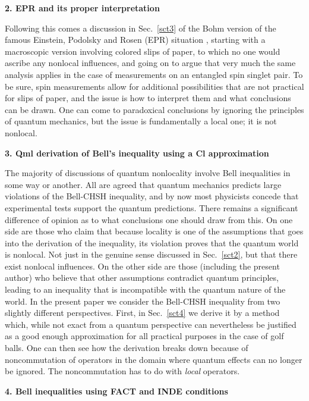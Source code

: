 \documentclass[10pt]{article} %
\def\outl#1{\par{\medskip\noindent\hspace*{.5cm}\bf
      \mathversion{bold}#1\mathversion{normal}\smallskip} }
\def\np{} \def\xa{} \def\xb{} \def\xn{} \def\xp{}
\def\outl#1{} \def\np{} \def\xa{} \def\xb{} \def\xn{} \def\xp{}
\def\outl#1{\par{\medskip\noindent\hspace*{.5cm}\bf
      \mathversion{bold}#1\mathversion{normal}\smallskip} }
\def\np{\newpage }\def\xn{\nopagebreak }\def\xp{\pagebreak }
\begin{document}
\xb
\outl{2. EPR and its proper interpretation }
\xa



Following this comes a discussion in Sec.~\ref{sct3} of the Bohm version
\cite{Bhm51s} of the famous Einstein, Podolsky and Rosen (EPR) situation
\cite{EnPR35}, starting with a macroscopic version involving colored slips of
paper, to which no one would ascribe any nonlocal influences, and going on to
argue that very much the same analysis applies in the case of measurements on
an entangled spin singlet pair.  To be sure, spin measurements allow for
additional possibilities that are not practical for slips of paper, and the
issue is how to interpret them and what conclusions can be drawn.  One can
come to paradoxical conclusions by ignoring the principles of quantum
mechanics, but the issue is fundamentally a local one; it is not nonlocal.

\xb
\outl{3. Qml derivation of Bell's inequality using a Cl approximation}
\xa


The majority of discussions of quantum nonlocality involve Bell inequalities 
\cite{CHSH69,Bll81,Bll90b} in some way or another.
%  
All are agreed that quantum mechanics predicts large violations of the
Bell-CHSH inequality, and by now most physicists concede that experimental
tests support the quantum predictions. There remains a significant difference
of opinion as to what conclusions one should draw from this.  On one side are
those who claim that because locality is one of the assumptions that goes into
the derivation of the inequality, its violation proves that the quantum world
is nonlocal. Not just in the genuine sense discussed in Sec.~\ref{sct2}, but
that there exist nonlocal influences.  On the other side are those (including
the present author) who believe that other assumptions contradict quantum
principles, leading to an inequality that is incompatible with the quantum
nature of the world.
%
In the present paper we consider the Bell-CHSH inequality from two slightly
different perspectives.
%
First, in Sec.~\ref{sct4} we derive it by a method
which, while not exact from a quantum perspective can nevertheless be
justified as a good enough approximation for all practical purposes in the
case of golf balls.  One can then see how the derivation breaks down because
of noncommutation of operators in the domain where quantum effects can no
longer be ignored. The noncommutation has to do with \emph{local} operators.

\xb
\outl{4. Bell inequalities using FACT and INDE conditions}
\xa
\end{document}

